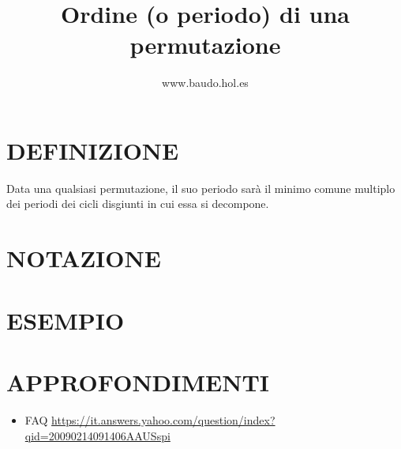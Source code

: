 \documentclass[a4paper,10pt]{article}
\title{Ordine (o periodo) di una permutazione}
\author{www.baudo.hol.es}
\begin{document}
\maketitle

\section{DEFINIZIONE}
Data una qualsiasi permutazione, il suo periodo sarà il minimo comune multiplo dei periodi dei cicli disgiunti in cui essa si decompone. 

\section{NOTAZIONE}

\section{ESEMPIO}

\section{APPROFONDIMENTI}
\begin{itemize}
 \item FAQ \href{https://it.answers.yahoo.com/question/index?qid=20090214091406AAUSspi}{https://it.answers.yahoo.com/question/index?qid=20090214091406AAUSspi}
\end{itemize}
\end{document}
